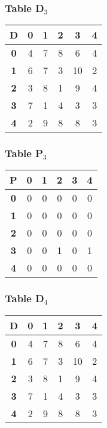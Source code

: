 \begin{frame}
\frametitle{Table D$_{3}$}
\begin{center}
    \begin{tabular}{|c||c|c|c|c|c|}
        \hline
        \textbf{D} & \textbf{0} & \textbf{1} & \textbf{2} & \textbf{3} & \textbf{4} \\
        \hline
        \hline
        \textbf{0}& 4 & 7 & 8 & 6 & 4 \\
        \hline
        \textbf{1}& 6 & 7 & 3 & 10 & 2 \\
        \hline
        \textbf{2}& 3 & 8 & 1 & 9 & 4 \\
        \hline
        \textbf{3}& 7 & 1 & 4 & 3 & 3 \\
        \hline
        \textbf{4}& 2 & 9 & 8 & 8 & 3 \\
        \hline
    \end{tabular}
\end{center}


\end{frame}


\begin{frame}
\frametitle{Table P$_{3}$}
\begin{center}
    \begin{tabular}{|c||c|c|c|c|c|}
        \hline
        \textbf{P} & \textbf{0} & \textbf{1} & \textbf{2} & \textbf{3} & \textbf{4} \\
        \hline
        \hline
        \textbf{0}& 0 & 0 & 0 & 0 & 0 \\
        \hline
        \textbf{1}& 0 & 0 & 0 & 0 & 0 \\
        \hline
        \textbf{2}& 0 & 0 & 0 & 0 & 0 \\
        \hline
        \textbf{3}& 0 & 0 & 1 & 0 & 1 \\
        \hline
        \textbf{4}& 0 & 0 & 0 & 0 & 0 \\
        \hline
    \end{tabular}
\end{center}


\end{frame}


\begin{frame}
\frametitle{Table D$_{4}$}
\begin{center}
    \begin{tabular}{|c||c|c|c|c|c|}
        \hline
        \textbf{D} & \textbf{0} & \textbf{1} & \textbf{2} & \textbf{3} & \textbf{4} \\
        \hline
        \hline
        \textbf{0}& 4 & 7 & 8 & 6 & 4 \\
        \hline
        \textbf{1}& 6 & 7 & 3 & 10 & 2 \\
        \hline
        \textbf{2}& 3 & 8 & 1 & 9 & 4 \\
        \hline
        \textbf{3}& 7 & 1 & 4 & 3 & 3 \\
        \hline
        \textbf{4}& 2 & 9 & 8 & 8 & 3 \\
        \hline
    \end{tabular}
\end{center}


\end{frame}


